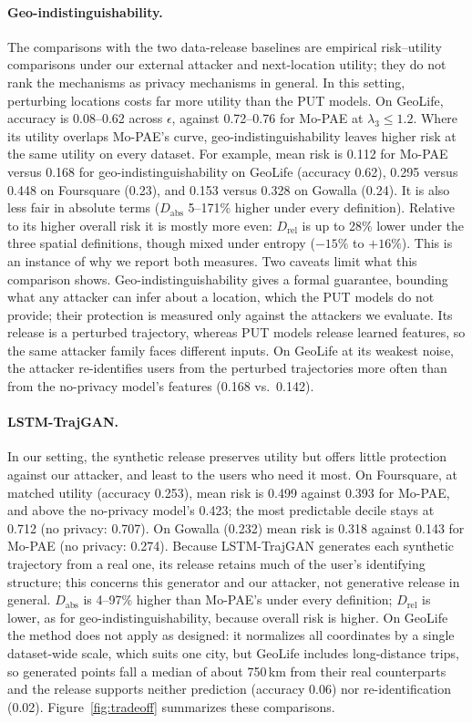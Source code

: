 \documentclass[sigconf,anonymous,review]{acmart}
\begin{document}
\paragraph{Geo-indistinguishability.} The comparisons with the two data-release baselines are empirical risk--utility comparisons under our external attacker and next-location utility; they do not rank the mechanisms as privacy mechanisms in general. In this setting, perturbing locations costs far more utility than the PUT models. On GeoLife, accuracy is 0.08--0.62 across $\epsilon$, against 0.72--0.76 for Mo-PAE at $\lambda_3\le1.2$. Where its utility overlaps Mo-PAE's curve, geo-indistinguishability leaves higher risk at the same utility on every dataset. For example, mean risk is 0.112 for Mo-PAE versus 0.168 for geo-indistinguishability on GeoLife (accuracy 0.62), 0.295 versus 0.448 on Foursquare (0.23), and 0.153 versus 0.328 on Gowalla (0.24). It is also less fair in absolute terms ($D_{\mathrm{abs}}$ 5--171\% higher under every definition). Relative to its higher overall risk it is mostly more even: $D_{\mathrm{rel}}$ is up to 28\% lower under the three spatial definitions, though mixed under entropy ($-15\%$ to $+16\%$). This is an instance of why we report both measures. Two caveats limit what this comparison shows. Geo-indistinguishability gives a formal guarantee, bounding what any attacker can infer about a location, which the PUT models do not provide; their protection is measured only against the attackers we evaluate. Its release is a perturbed trajectory, whereas PUT models release learned features, so the same attacker family faces different inputs. On GeoLife at its weakest noise, the attacker re-identifies users from the perturbed trajectories more often than from the no-privacy model's features (0.168 vs.\ 0.142).

\paragraph{LSTM-TrajGAN\@.} In our setting, the synthetic release preserves utility but offers little protection against our attacker, and least to the users who need it most. On Foursquare, at matched utility (accuracy 0.253), mean risk is 0.499 against 0.393 for Mo-PAE, and above the no-privacy model's 0.423; the most predictable decile stays at 0.712 (no privacy: 0.707). On Gowalla (0.232) mean risk is 0.318 against 0.143 for Mo-PAE (no privacy: 0.274). Because LSTM-TrajGAN generates each synthetic trajectory from a real one, its release retains much of the user's identifying structure; this concerns this generator and our attacker, not generative release in general. $D_{\mathrm{abs}}$ is 4--97\% higher than Mo-PAE's under every definition; $D_{\mathrm{rel}}$ is lower, as for geo-indistinguishability, because overall risk is higher. On GeoLife the method does not apply as designed: it normalizes all coordinates by a single dataset-wide scale, which suits one city, but GeoLife includes long-distance trips, so generated points fall a median of about 750\,km from their real counterparts and the release supports neither prediction (accuracy 0.06) nor re-identification (0.02). Figure~\ref{fig:tradeoff} summarizes these comparisons.
\end{document}
